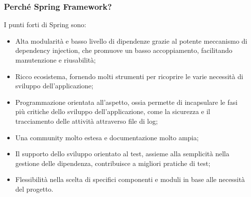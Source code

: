             \subsubsection{Perché Spring Framework? \cite{Spoclearn1}}
                I punti forti di Spring sono:
                \begin{itemize}
                    \item Alta modularità e basso livello di dipendenze grazie al potente meccanismo di dependency injection, che promuove un basso accoppiamento, facilitando manutenzione e riusabilità;
                    \item  Ricco ecosistema, fornendo molti strumenti per ricoprire le varie necessità di sviluppo dell'applicazione;
                    \item Programmazione orientata all'aspetto, ossia permette di incapsulare le fasi più critiche dello sviluppo dell'applicazione, come la sicurezza e il tracciamento delle attività attraverso file di log;
                    \item Una community molto estesa e documentazione molto ampia;
                    \item Il supporto dello sviluppo orientato al test, assieme alla semplicità nella gestione delle dipendenza, contribuisce a migliori pratiche di test;
                    \item Flessibilità nella scelta di specifici componenti e moduli in base alle necessità del progetto.
                \end{itemize}